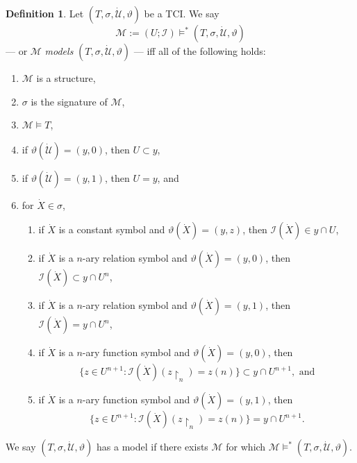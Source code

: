 \documentclass[12pt, twoside]{memoir}
\numberwithin{equation}{section}
\theoremstyle{definition}
\newtheorem{defi}[thm]{Definition}
\theoremstyle{remark}
\theoremstyle{definition}
\theoremstyle{definition}
\theoremstyle{definition}
\theoremstyle{remark}
\begin{document}
\begin{defi}
Let $(T, \sigma, \dot{\mathcal{U}}, \vartheta)$ be a TCI. We say $$\mathcal{M} := (U; \mathcal{I}) \models^* (T, \sigma, \dot{\mathcal{U}}, \vartheta)$$ --- or $\mathcal{M}$ \emph{models} $(T, \sigma, \dot{\mathcal{U}}, \vartheta)$ --- iff all of the following holds:
\begin{enumerate}[label=(\alph*)]
    \item $\mathcal{M}$ is a structure,
    \item $\sigma$ is the signature of $\mathcal{M}$,
    \item $\mathcal{M} \models T$,
    \item if $\vartheta(\dot{\mathcal{U}}) = (y, 0)$, then $U \subset y$,
    \item if $\vartheta(\dot{\mathcal{U}}) = (y, 1)$, then $U = y$, and
    \item for $\dot{X} \in \sigma$,
    \begin{enumerate}[label=(\roman*)]
        \item if $\dot{X}$ is a constant symbol and $\vartheta(\dot{X}) = (y, z)$, then $\mathcal{I}(\dot{X}) \in y \cap U$,
        \item if $\dot{X}$ is a $n$-ary relation symbol and $\vartheta(\dot{X}) = (y, 0)$, then $\mathcal{I}(\dot{X}) \subset y \cap U^{n}$,
        \item if $\dot{X}$ is a $n$-ary relation symbol and $\vartheta(\dot{X}) = (y, 1)$, then $\mathcal{I}(\dot{X}) = y \cap U^{n}$,
        \item if $\dot{X}$ is a $n$-ary function symbol and $\vartheta(\dot{X}) = (y, 0)$, then $$\{z \in U^{n+1} : \mathcal{I}(\dot{X})(z \! \restriction_n) = z(n)\} \subset y \cap U^{n+1}, \text{ and}$$
        \item if $\dot{X}$ is a $n$-ary function symbol and $\vartheta(\dot{X}) = (y, 1)$, then $$\{z \in U^{n+1} : \mathcal{I}(\dot{X})(z \! \restriction_n) = z(n)\} = y \cap U^{n+1}.$$
    \end{enumerate}
\end{enumerate}
We say $(T, \sigma, \dot{\mathcal{U}}, \vartheta)$ has a model if there exists $\mathcal{M}$ for which $\mathcal{M} \models^* (T, \sigma, \dot{\mathcal{U}}, \vartheta)$.
\end{defi}
\end{document}
